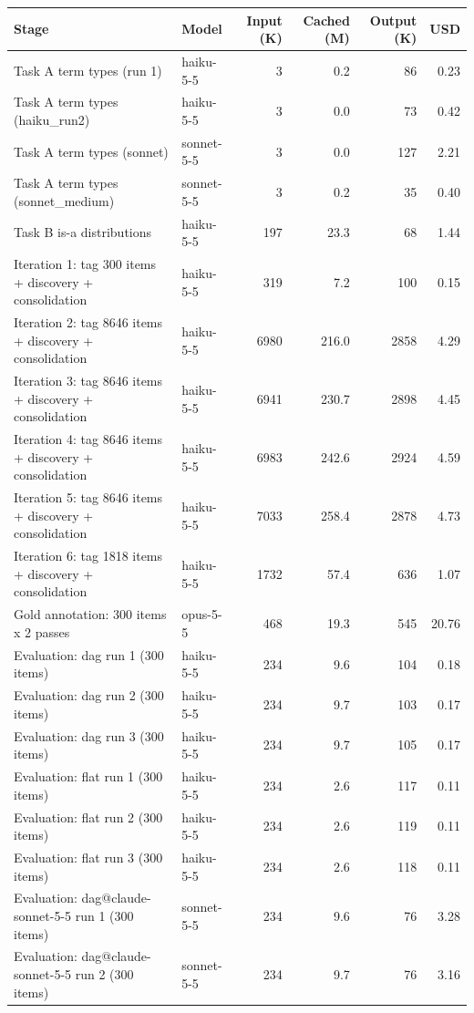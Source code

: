 \begin{tabular}{llrrrr}
\toprule
Stage & Model & Input (K) & Cached (M) & Output (K) & USD \\
\midrule
Task A term types (run 1) & haiku-5-5 & 3 & 0.2 & 86 & 0.23 \\
Task A term types (haiku_run2) & haiku-5-5 & 3 & 0.0 & 73 & 0.42 \\
Task A term types (sonnet) & sonnet-5-5 & 3 & 0.0 & 127 & 2.21 \\
Task A term types (sonnet_medium) & sonnet-5-5 & 3 & 0.2 & 35 & 0.40 \\
Task B is-a distributions & haiku-5-5 & 197 & 23.3 & 68 & 1.44 \\
Iteration 1: tag 300 items + discovery + consolidation & haiku-5-5 & 319 & 7.2 & 100 & 0.15 \\
Iteration 2: tag 8646 items + discovery + consolidation & haiku-5-5 & 6980 & 216.0 & 2858 & 4.29 \\
Iteration 3: tag 8646 items + discovery + consolidation & haiku-5-5 & 6941 & 230.7 & 2898 & 4.45 \\
Iteration 4: tag 8646 items + discovery + consolidation & haiku-5-5 & 6983 & 242.6 & 2924 & 4.59 \\
Iteration 5: tag 8646 items + discovery + consolidation & haiku-5-5 & 7033 & 258.4 & 2878 & 4.73 \\
Iteration 6: tag 1818 items + discovery + consolidation & haiku-5-5 & 1732 & 57.4 & 636 & 1.07 \\
Gold annotation: 300 items x 2 passes & opus-5-5 & 468 & 19.3 & 545 & 20.76 \\
Evaluation: dag run 1 (300 items) & haiku-5-5 & 234 & 9.6 & 104 & 0.18 \\
Evaluation: dag run 2 (300 items) & haiku-5-5 & 234 & 9.7 & 103 & 0.17 \\
Evaluation: dag run 3 (300 items) & haiku-5-5 & 234 & 9.7 & 105 & 0.17 \\
Evaluation: flat run 1 (300 items) & haiku-5-5 & 234 & 2.6 & 117 & 0.11 \\
Evaluation: flat run 2 (300 items) & haiku-5-5 & 234 & 2.6 & 119 & 0.11 \\
Evaluation: flat run 3 (300 items) & haiku-5-5 & 234 & 2.6 & 118 & 0.11 \\
Evaluation: dag@claude-sonnet-5-5 run 1 (300 items) & sonnet-5-5 & 234 & 9.6 & 76 & 3.28 \\
Evaluation: dag@claude-sonnet-5-5 run 2 (300 items) & sonnet-5-5 & 234 & 9.7 & 76 & 3.16 \\

\end{tabular}
